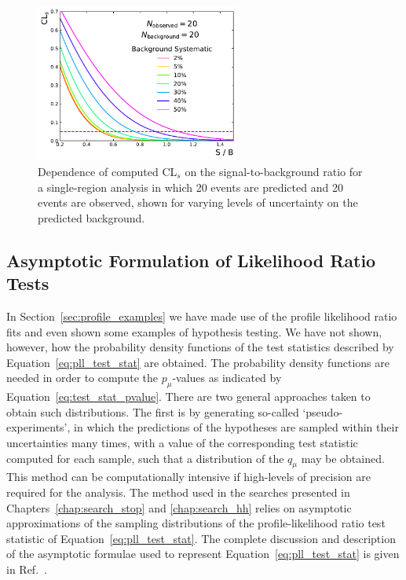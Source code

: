 \begin{figure}[!htb]
    \begin{center}
        \includegraphics[width=0.6\textwidth]{figures/common_ana/stat_hypo/cls_bkguncert_scan}
        \caption{
            Dependence of computed CL$_s$ on the signal-to-background ratio for a single-region
            analysis in which 20 events are predicted and 20 events are observed, shown
            for varying levels of uncertainty on the predicted background.
        }
        \label{fig:cls_scan_uncert}
    \end{center}
\end{figure}

\FloatBarrier
\subsection{Asymptotic Formulation of Likelihood Ratio Tests}
\label{sec:asymptotics}

In Section~\ref{sec:profile_examples} we have made use of the profile likelihood ratio fits and
even shown some examples of hypothesis testing.
We have not shown, however, how the probability density functions of the test statistics described
by Equation~\ref{eq:pll_test_stat} are obtained.
The probability density functions are needed in order to compute the $p_{\mu}$-values as indicated
by Equation~\ref{eq:test_stat_pvalue}.
There are two general approaches taken to obtain such distributions.
The first is by generating so-called `pseudo-experiments', in which the predictions of the hypotheses are sampled within their uncertainties many times,
with a value of the corresponding test statistic computed for each sample, such that a distribution
of the $q_{\mu}$ may be obtained.
This method can be computationally intensive if high-levels
of precision are required for the analysis.
The method used in the searches presented in Chapters~\ref{chap:search_stop} and \ref{chap:search_hh}
relies on asymptotic approximations of the sampling distributions of the 
profile-likelihood ratio test statistic of Equation~\ref{eq:pll_test_stat}.
The complete discussion and description of the asymptotic formulae used to represent
Equation~\ref{eq:pll_test_stat} is given in Ref.~\cite{AsymptoticFormula}.

